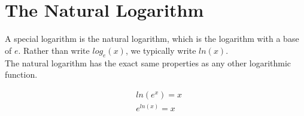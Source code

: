 \section{The Natural Logarithm}

A special logarithm is the natural logarithm, which is the logarithm with a base of $ e $. Rather than write $ log_e(x) $, we typically write $ ln(x) $. \\

The natural logarithm has the exact same properties as any other logarithmic function. \\

\begin{theorem}
	\begin{align}
		 & ln(e^x) = x   \\
		 & e^{ln(x)} = x
	\end{align}
\end{theorem}

